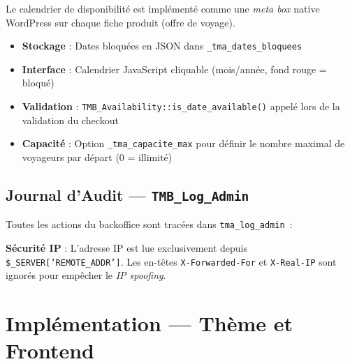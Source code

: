 \documentclass[12pt,a4paper]{report}
\begin{document}
Le calendrier de disponibilit\'e est impl\'ement\'e comme une \textit{meta box}
native WordPress sur chaque fiche produit (offre de voyage).

\begin{itemize}
  \item \textbf{Stockage} : Dates bloqu\'ees en JSON dans \texttt{\_tma\_dates\_bloquees}
  \item \textbf{Interface} : Calendrier JavaScript cliquable (mois/ann\'ee, fond rouge = bloqu\'e)
  \item \textbf{Validation} : \texttt{TMB\_Availability::is\_date\_available()} appel\'e
        lors de la validation du checkout
  \item \textbf{Capacit\'e} : Option \texttt{\_tma\_capacite\_max} pour d\'efinir le
        nombre maximal de voyageurs par d\'epart (0 = illimit\'e)
\end{itemize}

\section{Journal d'Audit --- \texttt{TMB\_Log\_Admin}}

Toutes les actions du backoffice sont trac\'ees dans \texttt{tma\_log\_admin}~:


\begin{notebox}
\textbf{S\'ecurit\'e IP} : L'adresse IP est lue exclusivement depuis
\texttt{\$\_SERVER['REMOTE\_ADDR']}. Les en-t\^etes \texttt{X-Forwarded-For}
et \texttt{X-Real-IP} sont ignor\'es pour emp\^echer le \textit{IP spoofing}.
\end{notebox}

\chapter{Impl\'ementation --- Th\`eme et Frontend}
\end{document}
